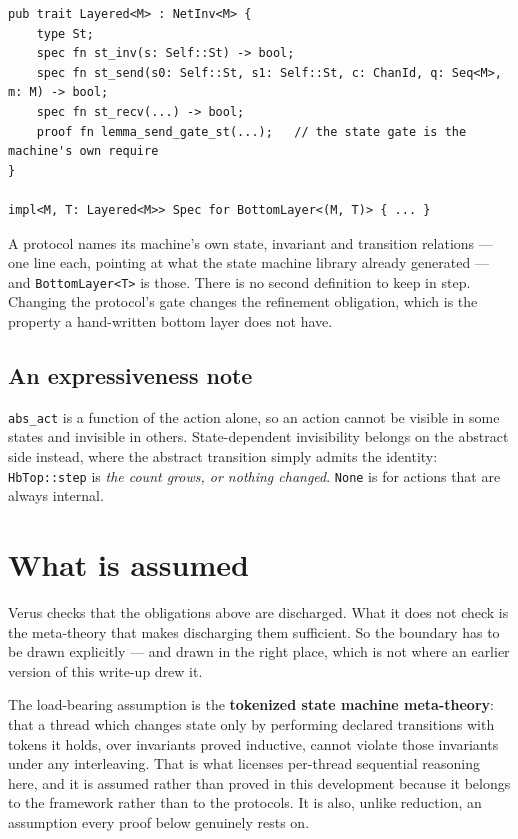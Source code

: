 \documentclass[11pt]{article}
\newcommand{\code}[1]{\texttt{#1}}
\newcommand{\srcname}[1]{%
  \vspace{0.9em}\noindent{\sffamily\scriptsize\color{comment}\MakeUppercase{#1}}\par
  \vspace{-0.7em}}
\begin{document}
\srcname{src/layer.rs}
\begin{lstlisting}
pub trait Layered<M> : NetInv<M> {
    type St;
    spec fn st_inv(s: Self::St) -> bool;
    spec fn st_send(s0: Self::St, s1: Self::St, c: ChanId, q: Seq<M>, m: M) -> bool;
    spec fn st_recv(...) -> bool;
    proof fn lemma_send_gate_st(...);   // the state gate is the machine's own require
}

impl<M, T: Layered<M>> Spec for BottomLayer<(M, T)> { ... }
\end{lstlisting}

A protocol names its machine's own state, invariant and transition relations ---
one line each, pointing at what the state machine library already generated ---
and \code{BottomLayer<T>} is those. There is no second definition to keep in
step. Changing the protocol's gate changes the refinement obligation, which is
the property a hand-written bottom layer does not have.

\subsection*{An expressiveness note}

\code{abs\_act} is a function of the action alone, so an action cannot be visible
in some states and invisible in others. State-dependent invisibility belongs on
the abstract side instead, where the abstract transition simply admits the
identity: \code{HbTop::step} is \emph{the count grows, or nothing changed}.
\code{None} is for actions that are always internal.

\section{What is assumed}\label{sec:assumed}

Verus checks that the obligations above are discharged. What it does not check
is the meta-theory that makes discharging them sufficient. So the boundary has
to be drawn explicitly --- and drawn in the right place, which is not where an
earlier version of this write-up drew it.

The load-bearing assumption is the \textbf{tokenized state machine
meta-theory}: that a thread which changes state only by performing declared
transitions with tokens it holds, over invariants proved inductive, cannot
violate those invariants under any interleaving. That is what licenses
per-thread sequential reasoning here, and it is assumed rather than proved in
this development because it belongs to the framework rather than to the
protocols. It is also, unlike reduction, an assumption every proof below
genuinely rests on.
\end{document}
